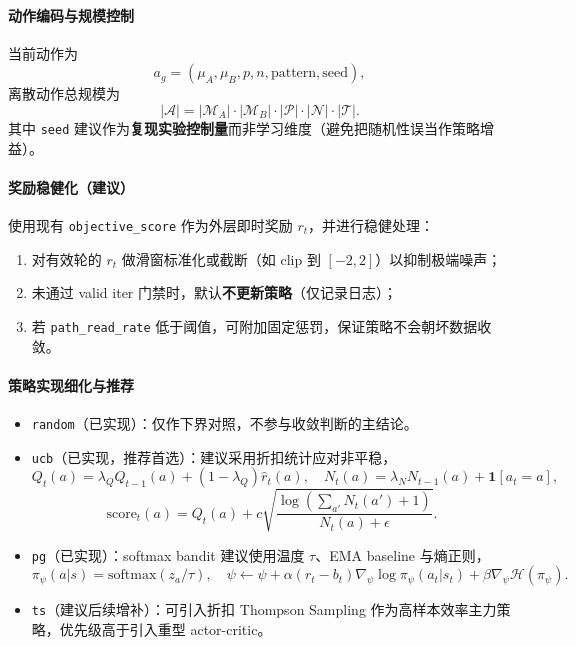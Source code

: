 \documentclass[UTF8,11pt,a4paper]{ctexart}
\begin{document}
\paragraph{动作编码与规模控制}
当前动作为
\begin{equation}
a_g=(\mu_A,\mu_B,p,n,\text{pattern},\text{seed}),
\end{equation}
离散动作总规模为
\begin{equation}
|\mathcal{A}|=|\mathcal{M}_A|\cdot|\mathcal{M}_B|\cdot|\mathcal{P}|\cdot|\mathcal{N}|\cdot|\mathcal{T}|.
\end{equation}
其中 \texttt{seed} 建议作为\textbf{复现实验控制量}而非学习维度（避免把随机性误当作策略增益）。

\paragraph{奖励稳健化（建议）}
使用现有 \texttt{objective\_score} 作为外层即时奖励 $r_t$，并进行稳健处理：
\begin{enumerate}
\item 对有效轮的 $r_t$ 做滑窗标准化或截断（如 clip 到 $[-2,2]$）以抑制极端噪声；
\item 未通过 valid iter 门禁时，默认\textbf{不更新策略}（仅记录日志）；
\item 若 \texttt{path\_read\_rate} 低于阈值，可附加固定惩罚，保证策略不会朝坏数据收敛。
\end{enumerate}

\paragraph{策略实现细化与推荐}
\begin{itemize}
\item \texttt{random}（已实现）：仅作下界对照，不参与收敛判断的主结论。
\item \texttt{ucb}（已实现，推荐首选）：建议采用折扣统计应对非平稳，
\begin{equation}
Q_t(a)=\lambda_Q Q_{t-1}(a)+(1-\lambda_Q)\hat r_t(a),\quad
N_t(a)=\lambda_N N_{t-1}(a)+\mathbf{1}[a_t=a],
\end{equation}
\begin{equation}
\mathrm{score}_t(a)=Q_t(a)+c\sqrt{\frac{\log(\sum_{a'}N_t(a')+1)}{N_t(a)+\epsilon}}.
\end{equation}
\item \texttt{pg}（已实现）：softmax bandit 建议使用温度 $\tau$、EMA baseline 与熵正则，
\begin{equation}
\pi_\psi(a|s)=\mathrm{softmax}(z_a/\tau),\quad
\psi\leftarrow\psi+\alpha(r_t-b_t)\nabla_\psi\log\pi_\psi(a_t|s_t)+\beta\nabla_\psi\mathcal{H}(\pi_\psi).
\end{equation}
\item \texttt{ts}（建议后续增补）：可引入折扣 Thompson Sampling 作为高样本效率主力策略，优先级高于引入重型 actor-critic。
\end{itemize}
\end{document}
